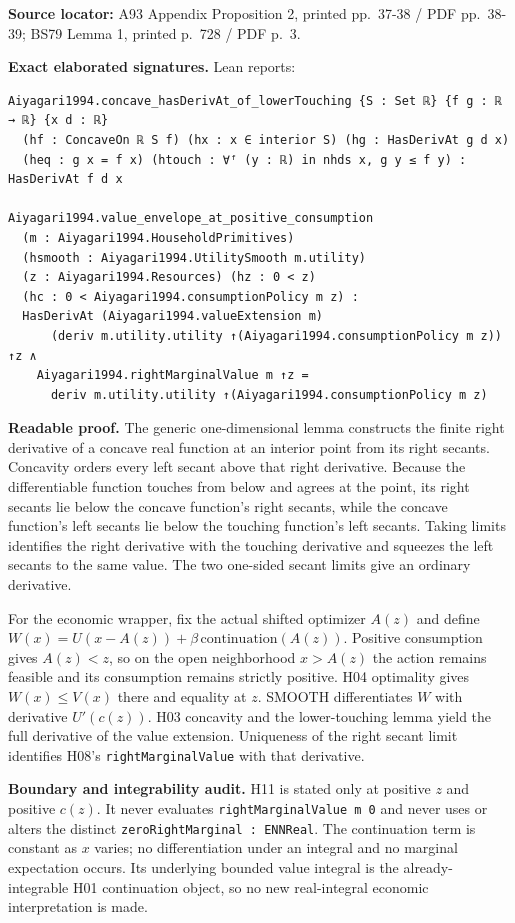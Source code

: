 \documentclass[
  11pt,
]{article}
\let\LedgerOriginalTexttt\texttt
\renewcommand{\texttt}[1]{{\small\LedgerOriginalTexttt{#1}}}
\begin{document}
\textbf{Source locator:} A93 Appendix Proposition 2, printed pp.~37-38 /
PDF pp.~38-39; BS79 Lemma 1, printed p.~728 / PDF p.~3.

\textbf{Exact elaborated signatures.} Lean reports:

\begin{verbatim}
Aiyagari1994.concave_hasDerivAt_of_lowerTouching {S : Set ℝ} {f g : ℝ → ℝ} {x d : ℝ}
  (hf : ConcaveOn ℝ S f) (hx : x ∈ interior S) (hg : HasDerivAt g d x)
  (heq : g x = f x) (htouch : ∀ᶠ (y : ℝ) in nhds x, g y ≤ f y) : HasDerivAt f d x

Aiyagari1994.value_envelope_at_positive_consumption
  (m : Aiyagari1994.HouseholdPrimitives)
  (hsmooth : Aiyagari1994.UtilitySmooth m.utility)
  (z : Aiyagari1994.Resources) (hz : 0 < z)
  (hc : 0 < Aiyagari1994.consumptionPolicy m z) :
  HasDerivAt (Aiyagari1994.valueExtension m)
      (deriv m.utility.utility ↑(Aiyagari1994.consumptionPolicy m z)) ↑z ∧
    Aiyagari1994.rightMarginalValue m ↑z =
      deriv m.utility.utility ↑(Aiyagari1994.consumptionPolicy m z)
\end{verbatim}

\textbf{Readable proof.} The generic one-dimensional lemma constructs
the finite right derivative of a concave real function at an interior
point from its right secants. Concavity orders every left secant above
that right derivative. Because the differentiable function touches from
below and agrees at the point, its right secants lie below the concave
function's right secants, while the concave function's left secants lie
below the touching function's left secants. Taking limits identifies the
right derivative with the touching derivative and squeezes the left
secants to the same value. The two one-sided secant limits give an
ordinary derivative.

For the economic wrapper, fix the actual shifted optimizer \(A(z)\) and
define \(W(x)=U(x-A(z))+\beta\,\mathrm{continuation}(A(z))\). Positive
consumption gives \(A(z)<z\), so on the open neighborhood \(x>A(z)\) the
action remains feasible and its consumption remains strictly positive.
H04 optimality gives \(W(x)\leq V(x)\) there and equality at \(z\).
SMOOTH differentiates \(W\) with derivative \(U'(c(z))\). H03 concavity
and the lower-touching lemma yield the full derivative of the value
extension. Uniqueness of the right secant limit identifies H08's
\texttt{rightMarginalValue} with that derivative.

\textbf{Boundary and integrability audit.} H11 is stated only at
positive \(z\) and positive \(c(z)\). It never evaluates
\texttt{rightMarginalValue\ m\ 0} and never uses or alters the distinct
\texttt{zeroRightMarginal\ :\ ENNReal}. The continuation term is
constant as \(x\) varies; no differentiation under an integral and no
marginal expectation occurs. Its underlying bounded value integral is
the already-integrable H01 continuation object, so no new real-integral
economic interpretation is made.
\end{document}
